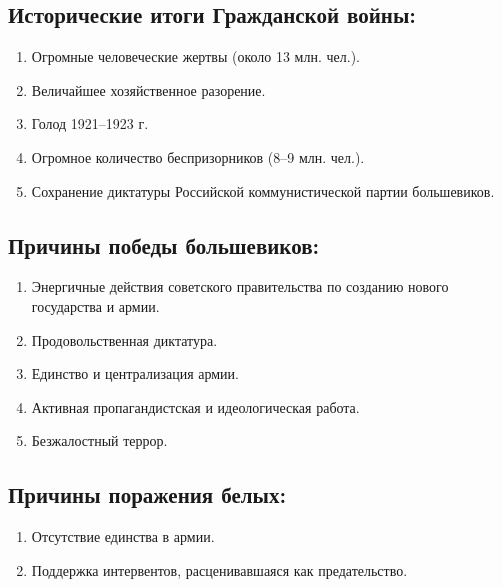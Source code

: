 \subsection{Исторические итоги Гражданской войны:}

\begin{enumerate}
    \item Огромные человеческие жертвы (около 13 млн. чел.).
    \item Величайшее хозяйственное разорение.
    \item Голод 1921--1923 г.
    \item Огромное количество беспризорников (8--9 млн. чел.). 
    \item Сохранение диктатуры Российской коммунистической партии большевиков.
\end{enumerate}

\subsection{Причины победы большевиков:}

\begin{enumerate}
    \item Энергичные действия советского правительства по созданию нового государства и армии.
    \item Продовольственная диктатура.
    \item Единство и централизация армии.
    \item Активная пропагандистская и идеологическая работа.
    \item Безжалостный террор.
\end{enumerate}

\subsection{Причины поражения белых:}

\begin{enumerate}
    \item Отсутствие единства в армии.
    \item Поддержка интервентов, расценивавшаяся как предательство.
\end{enumerate}
